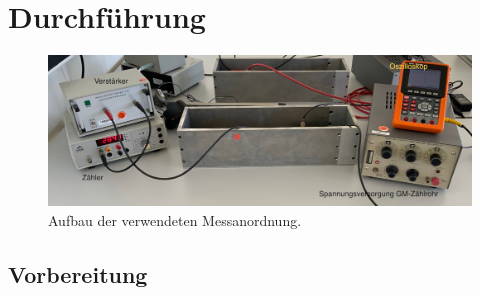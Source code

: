 \section{Durchführung}
\label{sec:durchführung}

\begin{figure}[H]
	\centering
	\includegraphics[width=0.9\linewidth]{content/grafik/aufbau.jpg}
	\caption{Aufbau der verwendeten Messanordnung.}
	\label{fig:aufbau}
\end{figure}

\subsection{Vorbereitung}

\newpage
